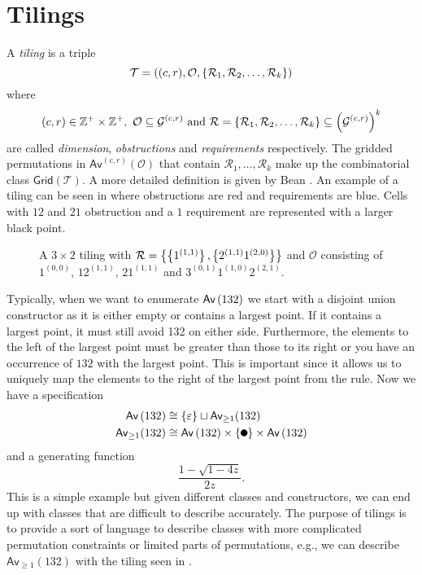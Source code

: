 \section{Tilings\label{sec:tilings}}
A \emph{tiling} is a triple
\[
\mathcal{T} = ((c,r), \mathcal{O}, \left\{\mathcal{R}_1,\mathcal{R}_2,\dotsc,\mathcal{R}_k\right\})
\]
where
\[
    (c,r) \in \mathbb{Z}^+ \times \mathbb{Z}^+, \ \mathcal{O} \subseteq \mathcal{G}^{(c,r)} \text{ and } \mathcal{R}=\left\{\mathcal{R}_1,\mathcal{R}_2,\dotsc,\mathcal{R}_k\right\} \subseteq \left(\mathcal{G}^{(c,r)}\right)^k
\]
are called \emph{dimension}, \emph{obstructions} and \emph{requirements} respectively. The gridded permutations in $\textsf{Av}^{(c,r)}\left(\mathcal{O}\right)$ that contain $\mathcal{R}_1,\dotsc,\mathcal{R}_k$ make up the combinatorial class $\textsf{Grid}(\mathcal{T})$. A more detailed definition is given by Bean \cite{BeanPhd:phd}. An example of a tiling can be seen in  where obstructions are red and requirements are blue. Cells with $12$ and $21$ obstruction and a $1$ requirement are represented with a larger black point.

\begin{figure}[ht!]
    \centering
    
    \caption{A $3 \times 2$ tiling with $\mathcal{R} = \left\{\left\{1^{(1,1)}\right\}, \left\{2^{(1,1)}1^{(2,0)}\right\}\right\}$ and $\mathcal{O}$ consisting of $1^{(0,0)}$, $12^{(1,1)}$, $21^{(1,1)}$ and $3^{(0,1)}1^{(1,0)}2^{(2,1)}$.}
    \label{fig:tiling_example}
\end{figure}

Typically, when we want to enumerate $\textsf{Av}\left(132\right)$ we start with a disjoint union constructor as it is either empty or contains a largest point. If it contains a largest point, it must still avoid 132 on either side. Furthermore, the elements to the left of the largest point must be greater than those to its right or you have an occurrence of $132$ with the largest point. This is important since it allows us to uniquely map the elements to the right of the largest point from the rule. Now we have a specification
\begin{align*}
\Av{132} &\cong \set{\varepsilon} \sqcup \textsf{Av}_{\geq1}(132)\\
\textsf{Av}_{\geq1}(132) &\cong \Av{132} \times \set{\point{0.1}} \times \Av{132}
\end{align*}
and a generating function
\[
\frac{1-\sqrt{1-4z}}{2z}.
\]
This is a simple example but given different classes and constructors, we can end up with classes that are difficult to describe accurately. The purpose of tilings is to provide a sort of language to describe classes with more complicated permutation constraints or limited parts of permutations, e.g., we can describe $\textsf{Av}_{\geq1}(132)$ with the tiling seen in .

